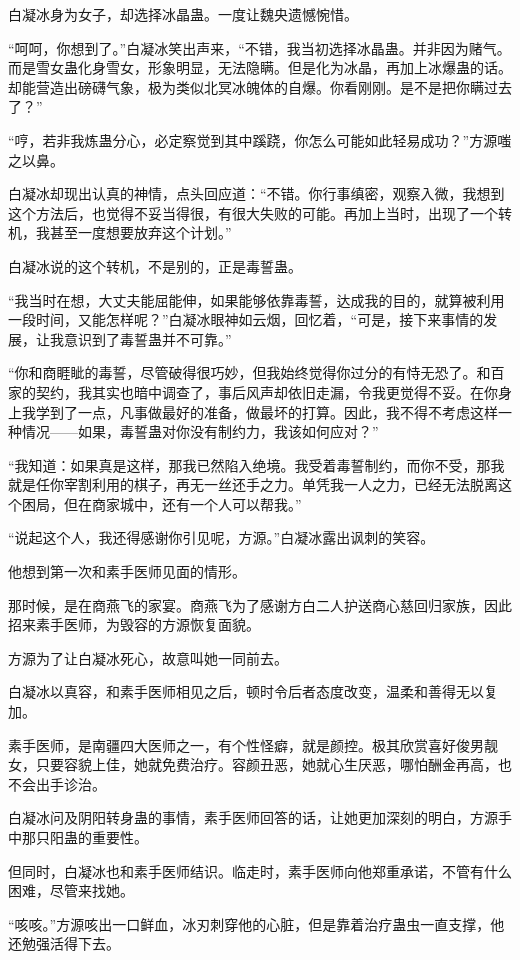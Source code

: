 \begin{this_body}
白凝冰身为女子，却选择冰晶蛊。一度让魏央遗憾惋惜。

“呵呵，你想到了。”白凝冰笑出声来，“不错，我当初选择冰晶蛊。并非因为赌气。而是雪女蛊化身雪女，形象明显，无法隐瞒。但是化为冰晶，再加上冰爆蛊的话。却能营造出磅礴气象，极为类似北冥冰魄体的自爆。你看刚刚。是不是把你瞒过去了？”

“哼，若非我炼蛊分心，必定察觉到其中蹊跷，你怎么可能如此轻易成功？”方源嗤之以鼻。

白凝冰却现出认真的神情，点头回应道：“不错。你行事缜密，观察入微，我想到这个方法后，也觉得不妥当得很，有很大失败的可能。再加上当时，出现了一个转机，我甚至一度想要放弃这个计划。”

白凝冰说的这个转机，不是别的，正是毒誓蛊。

“我当时在想，大丈夫能屈能伸，如果能够依靠毒誓，达成我的目的，就算被利用一段时间，又能怎样呢？”白凝冰眼神如云烟，回忆着，“可是，接下来事情的发展，让我意识到了毒誓蛊并不可靠。”

“你和商睚眦的毒誓，尽管破得很巧妙，但我始终觉得你过分的有恃无恐了。和百家的契约，我其实也暗中调查了，事后风声却依旧走漏，令我更觉得不妥。在你身上我学到了一点，凡事做最好的准备，做最坏的打算。因此，我不得不考虑这样一种情况——如果，毒誓蛊对你没有制约力，我该如何应对？”

“我知道：如果真是这样，那我已然陷入绝境。我受着毒誓制约，而你不受，那我就是任你宰割利用的棋子，再无一丝还手之力。单凭我一人之力，已经无法脱离这个困局，但在商家城中，还有一个人可以帮我。”

“说起这个人，我还得感谢你引见呢，方源。”白凝冰露出讽刺的笑容。

他想到第一次和素手医师见面的情形。

那时候，是在商燕飞的家宴。商燕飞为了感谢方白二人护送商心慈回归家族，因此招来素手医师，为毁容的方源恢复面貌。

方源为了让白凝冰死心，故意叫她一同前去。

白凝冰以真容，和素手医师相见之后，顿时令后者态度改变，温柔和善得无以复加。

素手医师，是南疆四大医师之一，有个性怪癖，就是颜控。极其欣赏喜好俊男靓女，只要容貌上佳，她就免费治疗。容颜丑恶，她就心生厌恶，哪怕酬金再高，也不会出手诊治。

白凝冰问及阴阳转身蛊的事情，素手医师回答的话，让她更加深刻的明白，方源手中那只阳蛊的重要性。

但同时，白凝冰也和素手医师结识。临走时，素手医师向他郑重承诺，不管有什么困难，尽管来找她。

“咳咳。”方源咳出一口鲜血，冰刃刺穿他的心脏，但是靠着治疗蛊虫一直支撑，他还勉强活得下去。


\end{this_body}
